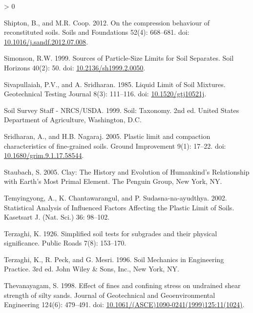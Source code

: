 \documentclass[
  letterpaper,
  openany]{book}
\newlength{\cslhangindent}
\newenvironment{CSLReferences}[2] %
 {%
  \setlength{\parindent}{0pt}
  \ifodd #1 \everypar{\setlength{\hangindent}{\cslhangindent}}\ignorespaces\fi
  \ifnum #2 > 0
  \setlength{\parskip}{#2\baselineskip}
  \fi
 }%
 {}
\begin{document}
\begin{CSLReferences}{1}{0}
\leavevmode\hypertarget{ref-Shipton2012}{}%
Shipton, B., and M.R. Coop. 2012. {On the compression behaviour of reconstituted soils}. Soils and Foundations 52(4): 668--681. doi: \href{https://doi.org/10.1016/j.sandf.2012.07.008}{10.1016/j.sandf.2012.07.008}.

\leavevmode\hypertarget{ref-Simonson1999}{}%
Simonson, R.W. 1999. {Sources of Particle-Size Limits for Soil Separates}. Soil Horizons 40(2): 50. doi: \href{https://doi.org/10.2136/sh1999.2.0050}{10.2136/sh1999.2.0050}.

\leavevmode\hypertarget{ref-Sivapullaiah1985}{}%
Sivapullaiah, P.V., and A. Sridharan. 1985. {Liquid Limit of Soil Mixtures.} Geotechnical Testing Journal 8(3): 111--116. doi: \href{https://doi.org/10.1520/gtj10521j}{10.1520/gtj10521j}.

\leavevmode\hypertarget{ref-USDA1999}{}%
Soil Survey Staff - NRCS/USDA. 1999. {Soil: Taxonomy}. 2nd ed. United States Department of Agriculture, Washington, D.C.

\leavevmode\hypertarget{ref-Sridharan2005a}{}%
Sridharan, A., and H.B. Nagaraj. 2005. {Plastic limit and compaction characteristics of fine-grained soils}. Ground Improvement 9(1): 17--22. doi: \href{https://doi.org/10.1680/grim.9.1.17.58544}{10.1680/grim.9.1.17.58544}.

\leavevmode\hypertarget{ref-Staubach2005}{}%
Staubach, S. 2005. {Clay: The History and Evolution of Humankind's Relationship with Earth's Most Primal Element}. The Penguin Group, New York, NY.

\leavevmode\hypertarget{ref-Temyingyong2002}{}%
Temyingyong, A., K. Chantawarangul, and P. Sudasna-na-ayudthya. 2002. {Statistical Analysis of Influenced Factors Affecting the Plastic Limit of Soils}. Kasetsart J. (Nat. Sci.) 36: 98--102.

\leavevmode\hypertarget{ref-Terzaghi1926}{}%
Terzaghi, K. 1926. {Simplified soil tests for subgrades and their physical significance}. Public Roads 7(8): 153--170.

\leavevmode\hypertarget{ref-Terzaghi1996}{}%
Terzaghi, K., R. Peck, and G. Mesri. 1996. {Soil Mechanics in Engineering Practice}. 3rd ed. John Wiley {\&} Sons, Inc., New York, NY.

\leavevmode\hypertarget{ref-Thevanayagam1998}{}%
Thevanayagam, S. 1998. {Effect of fines and confining stress on undrained shear strength of silty sands}. Journal of Geotechnical and Geoenvironmental Engineering 124(6): 479--491. doi: \href{https://doi.org/10.1061/(ASCE)1090-0241(1999)125:11(1024)}{10.1061/(ASCE)1090-0241(1999)125:11(1024)}.


\end{CSLReferences}
\end{document}
